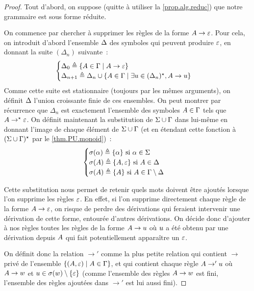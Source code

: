 \begin{proof}
  Tout d'abord, on suppose (quitte à utiliser la \cref{prop.alg.reduc}) que
  notre grammaire est sous forme réduite.

  On commence par chercher à supprimer les règles de la forme $A \to \varepsilon$.
  Pour cela, on introduit d'abord l'ensemble $\Delta$ des symboles qui peuvent
  produire $\varepsilon$, en donnant la suite $(\Delta_n)$ suivante~:
  \[\begin{cases}
  \Delta_0 \triangleq \left\{ A \in \Gamma \;\middle\vert\; A \to \varepsilon \right\}\\
  \Delta_{n+1} \triangleq \Delta_n \cup
  \left\{ A\in\Gamma \;\middle\vert\; \exists u \in(\Delta_n)^{\star}, A \to u \right\}
  \end{cases}\]
  Comme cette suite est stationnaire (toujours par les mêmes arguments), on
  définit $\Delta$ l'union croissante finie de ces ensembles. On peut montrer par
  récurrence que $\Delta_n$ est exactement l'ensemble des symboles $A\in\Gamma$
  tels que $A \to^{\mathord{\star}} \varepsilon$. On définit maintenant la substitution de
  $\Sigma\cup\Gamma$ dans lui-même en donnant l'image de chaque élément de
  $\Sigma\cup\Gamma$ (et en étendant cette fonction à $(\Sigma\cup\Gamma)^{\star}$ par le
  \cref{thm.PU.monoid})~:
  \[\begin{cases}
  \sigma(\alpha) \triangleq \{\alpha\} \text{ si } \alpha \in \Sigma\\
  \sigma(A) \triangleq \{A , \varepsilon\} \text{ si } A \in \Delta\\
  \sigma(A) \triangleq \{A\} \text{ si } A \in\Gamma\setminus\Delta
  \end{cases}\]

  Cette substitution nous permet de retenir quels mots doivent être ajoutés
  lorsque l'on supprime les règles $\varepsilon$. En effet, si l'on supprime
  directement chaque règle de la forme $A \to \varepsilon$, on risque de perdre des
  dérivations qui feraient intervenir une dérivation de cette forme, entourée
  d'autres dérivations. On décide donc d'ajouter à nos règles toutes les règles
  de la forme $A\to u$ où $u$ a été obtenu par une dérivation depuis
  $A$ qui fait potentiellement apparaître un $\varepsilon$.

  On définit donc la relation $\to'$ comme la plus petite relation qui contient
  $\to$ privé de l'ensemble $\left\{ (A,\varepsilon) \;\middle\vert\; A\in\Gamma \right\}$, et qui contient
  chaque règle $A \to' u$ où $A \to w$ et
  $u \in \sigma(w)\setminus\{\varepsilon\}$ (comme l'ensemble des règles
  $A \to w$ est fini, l'ensemble des règles ajoutées dans $\to'$ est lui
  aussi fini).


\end{proof}
